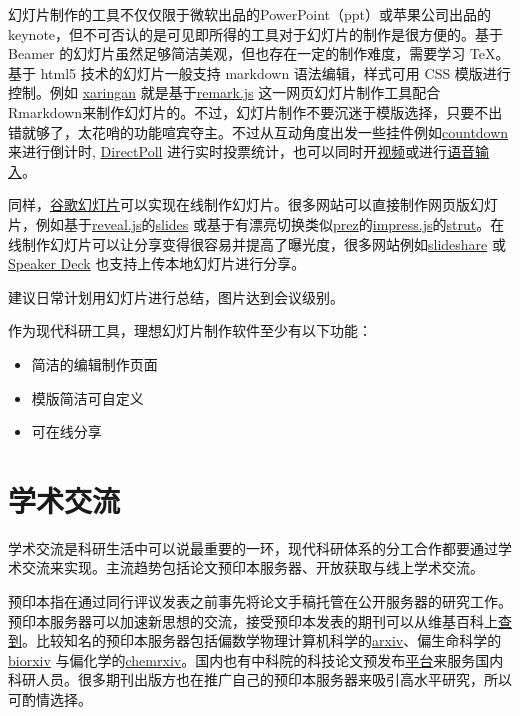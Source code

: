 \documentclass[]{tufte-book}
\providecommand{\tightlist}{%
  \setlength{\itemsep}{0pt}\setlength{\parskip}{0pt}}
\begin{document}
幻灯片制作的工具不仅仅限于微软出品的PowerPoint（ppt）或苹果公司出品的 keynote，但不可否认的是可见即所得的工具对于幻灯片的制作是很方便的。基于 Beamer 的幻灯片虽然足够简洁美观，但也存在一定的制作难度，需要学习 TeX。基于 html5 技术的幻灯片一般支持 markdown 语法编辑，样式可用 CSS 模版进行控制。例如 \href{https://github.com/yihui/xaringan}{xaringan} 就是基于\href{https://remarkjs.com}{remark.js} 这一网页幻灯片制作工具配合Rmarkdown来制作幻灯片的。不过，幻灯片制作不要沉迷于模版选择，只要不出错就够了，太花哨的功能喧宾夺主。不过从互动角度出发一些挂件例如\href{https://pkg.garrickadenbuie.com/countdown}{countdown} 来进行倒计时, \href{https://directpoll.com}{DirectPoll} 进行实时投票统计，也可以同时开\href{https://yihui.name/en/2017/12/html5-camera/}{视频}或进行\href{https://yihui.shinyapps.io/voice/}{语音输入}。

同样，\href{https://www.google.com/intl/zh-CN_us/slides/about/}{谷歌幻灯片}可以实现在线制作幻灯片。很多网站可以直接制作网页版幻灯片，例如基于\href{https://revealjs.com}{reveal.js}的\href{https://slides.com/}{slides} 或基于有漂亮切换类似\href{https://prezi.com/}{prez}的\href{https://impress.js.org/\#/source}{impress.js}的\href{http://strut.io}{strut}。在线制作幻灯片可以让分享变得很容易并提高了曝光度，很多网站例如\href{https://www.slideshare.net/}{slideshare} 或 \href{https://speakerdeck.com/}{Speaker Deck} 也支持上传本地幻灯片进行分享。

建议日常计划用幻灯片进行总结，图片达到会议级别。

作为现代科研工具，理想幻灯片制作软件至少有以下功能：

\begin{itemize}
\tightlist
\item
  简洁的编辑制作页面
\item
  模版简洁可自定义
\item
  可在线分享
\end{itemize}

\hypertarget{ux5b66ux672fux4ea4ux6d41}{%
\section*{学术交流}\label{ux5b66ux672fux4ea4ux6d41}}

学术交流是科研生活中可以说最重要的一环，现代科研体系的分工合作都要通过学术交流来实现。主流趋势包括论文预印本服务器、开放获取与线上学术交流。

预印本指在通过同行评议发表之前事先将论文手稿托管在公开服务器的研究工作。预印本服务器可以加速新思想的交流，接受预印本发表的期刊可以从维基百科上\href{https://en.wikipedia.org/wiki/List_of_academic_journals_by_preprint_policy}{查到}。比较知名的预印本服务器包括偏数学物理计算机科学的\href{https://arxiv.org/}{arxiv}、偏生命科学的\href{https://www.biorxiv.org/}{biorxiv} 与偏化学的\href{https://chemrxiv.org/}{chemrxiv}。国内也有中科院的科技论文预发布\href{http://chinaxiv.org/home.htm}{平台}来服务国内科研人员。很多期刊出版方也在推广自己的预印本服务器来吸引高水平研究，所以可酌情选择。
\end{document}
